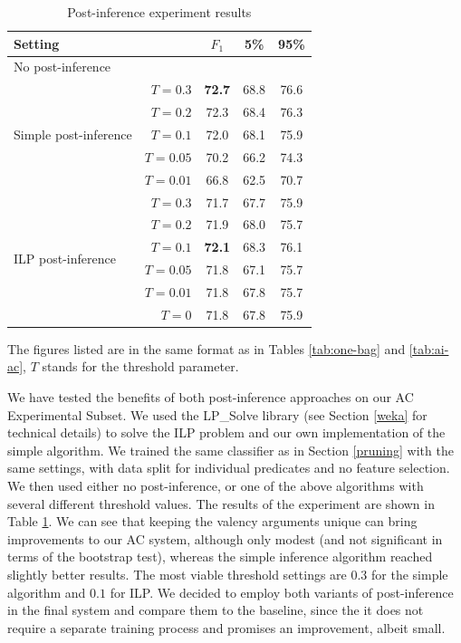 \documentclass[12pt,notitlepage]{report}
\begin{document}
\begin{table}[htb]\label{tab:post-inference}
\caption{Post-inference experiment results}\footnotesize
\begin{center}
\begin{tabular}{|lr|c|c|c|}\hline
\multicolumn{2}{|l|}{\bf Setting} & $F_1$ & \bf 5\% & \bf 95\% \\\hline
\multicolumn{2}{|l|}{No post-inference} & & & \\\hline
\multirow{5}{*}{Simple post-inference} & $T = 0.3$ & \bf 72.7 & 68.8 & 76.6 \\
& $T = 0.2$ & 72.3 & 68.4 & 76.3 \\
& $T = 0.1$ & 72.0 & 68.1 & 75.9 \\
& $T = 0.05$ & 70.2 & 66.2 & 74.3 \\
& $T = 0.01$ & 66.8 & 62.5 & 70.7 \\\hline
\multirow{6}{*}{ILP post-inference} & $T = 0.3$ & 71.7 & 67.7 & 75.9 \\
& $T = 0.2$ & 71.9 & 68.0 & 75.7 \\
& $T = 0.1$ & \bf 72.1 & 68.3 & 76.1 \\
& $T = 0.05$ & 71.8 & 67.1 & 75.7 \\
& $T = 0.01$ & 71.8 & 67.8 & 75.7 \\
& $T = 0$ & 71.8 & 67.8 & 75.9 \\\hline
\end{tabular}
\end{center}
The figures listed are in the same format as in Tables \ref{tab:one-bag} and \ref{tab:ai-ac}, $T$ stands for the threshold parameter.
\end{table}

We have tested the benefits of both post-inference approaches on our AC Experimental Subset. We used the LP\_Solve library (see Section \ref{weka} for technical details) to solve the ILP problem and our own implementation of the simple algorithm. We trained the same classifier as in Section \ref{pruning} with the same settings, with data split for individual predicates and no feature selection. We then used either no post-inference, or one of the above algorithms with several different threshold values. The results of the experiment are shown in Table \ref{tab:post-inference}. We can see that keeping the valency arguments unique can bring improvements to our AC system, although only modest (and not significant in terms of the bootstrap test), whereas the simple inference algorithm reached slightly better results. The most viable threshold settings are $0.3$ for the simple algorithm and $0.1$ for ILP. We decided to employ both variants of post-inference in the final system and compare them to the baseline, since the it does not require a separate training process and promises an improvement, albeit small.
\end{document}
